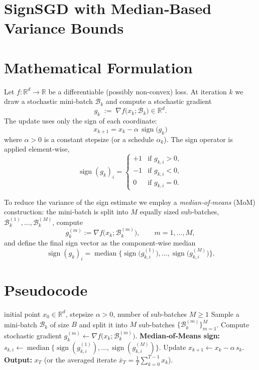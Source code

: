 \documentclass{article}
\newcommand{\sign}{\operatorname{sign}}
\newcommand{\RR}{\mathbb{R}}
\begin{document}
\section*{SignSGD with Median‑Based Variance Bounds}

\section*{Mathematical Formulation}
Let $f:\RR^{d}\rightarrow\RR$ be a differentiable (possibly non‑convex) loss.  
At iteration $k$ we draw a stochastic mini‑batch $\mathcal{B}_{k}$ and compute a stochastic gradient
\[
g_{k}\;:=\;\nabla f\bigl(x_{k};\mathcal{B}_{k}\bigr)\in\RR^{d}.
\]
The update uses only the sign of each coordinate:
\begin{equation}
\boxed{ \;x_{k+1}=x_{k}-\alpha\,\sign\!\bigl(g_{k}\bigr)\; } \tag{1}
\end{equation}
where $\alpha>0$ is a constant stepsize (or a schedule $\alpha_{k}$).  
The sign operator is applied element‑wise,
\[
\sign(g_{k})_{i}= 
\begin{cases}
+1 & \text{if } g_{k,i}>0,\\[2pt]
-1 & \text{if } g_{k,i}<0,\\[2pt]
0  & \text{if } g_{k,i}=0 .
\end{cases}
\]

To reduce the variance of the sign estimate we employ a \emph{median‑of‑means} (MoM) construction: the mini‑batch is split into $M$ equally sized sub‑batches,
$\mathcal{B}_{k}^{(1)},\dots,\mathcal{B}_{k}^{(M)}$, compute
\[
g_{k}^{(m)}:=\nabla f\bigl(x_{k};\mathcal{B}_{k}^{(m)}\bigr),\qquad m=1,\dots,M,
\]
and define the final sign vector as the component‑wise median
\[
\sign(g_{k})_{i}= \operatorname{median}\bigl\{ \sign\!\bigl(g_{k,i}^{(1)}\bigr),\dots,\sign\!\bigl(g_{k,i}^{(M)}\bigr)\bigr\}.
\]

\section*{Pseudocode}
\begin{algorithm}[H]
\caption{SignSGD with Median‑of‑Means}
\begin{algorithmic}[1]
\Require initial point $x_{0}\in\RR^{d}$, stepsize $\alpha>0$, number of sub‑batches $M\ge 1$
    \State Sample a mini‑batch $\mathcal{B}_{k}$ of size $B$ and split it into $M$ sub‑batches $\{\mathcal{B}_{k}^{(m)}\}_{m=1}^{M}$.
        \State Compute stochastic gradient $g_{k}^{(m)}\gets \nabla f\bigl(x_{k};\mathcal{B}_{k}^{(m)}\bigr)$.
    \EndFor
    \State \textbf{Median‑of‑Means sign:}
        \State $s_{k,i}\gets \operatorname{median}\bigl\{ \sign(g_{k,i}^{(1)}),\dots,\sign(g_{k,i}^{(M)})\bigr\}$.
    \EndFor
    \State Update $x_{k+1}\gets x_{k}-\alpha\,s_{k}$.
\EndFor
\State \textbf{Output:} $x_{T}$ (or the averaged iterate $\bar{x}_{T}=\frac1T\sum_{k=0}^{T-1}x_{k}$).
\end{algorithmic}
\end{algorithm}
\end{document}
